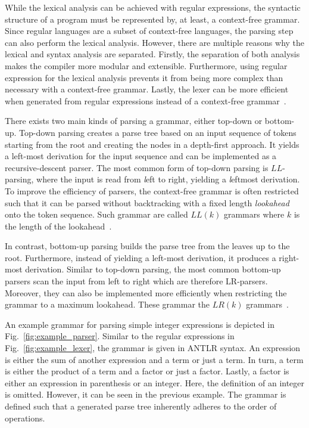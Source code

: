 While the lexical analysis can be achieved with regular expressions, the syntactic structure of a program must be represented by, at least, a context-free grammar. Since regular languages are a subset of context-free languages, 
the parsing step can also perform the lexical analysis. However, there are multiple reasons why the lexical and syntax analysis are separated. Firstly, the separation of both analysis makes the compiler more modular and extensible. Furthermore, using regular expression for the lexical analysis prevents it from being more complex than necessary with a context-free grammar. Lastly, the lexer can be more efficient when generated from regular expressions instead of a context-free grammar~\cite{VSSD07}. 

There exists two main kinds of parsing a grammar, either top-down or bottom-up.
Top-down parsing creates a parse tree based on an input sequence of tokens starting from the root and creating the nodes in a depth-first approach. It yields a left-most derivation for the input sequence and can be implemented as a recursive-descent parser. The most common form of top-down parsing is $LL$-parsing, where the input is read from \emph{l}eft to right, yielding a \emph{l}eftmost derivation. To improve the efficiency of parsers, the context-free grammar is often restricted such that it can be parsed without backtracking with a fixed length \emph{lookahead} onto the token sequence. Such grammar are called $LL(k)$ grammars where $k$ is the length of the lookahead~\cite{VSSD07,PaFi11}.  

In contrast, bottom-up parsing builds the parse tree from the leaves up to the root. Furthermore, instead of yielding a left-most derivation, it produces a right-most derivation. Similar to top-down parsing, the most common bottom-up parsers scan the input from left to right which are therefore LR-parsers. Moreover, they can also be implemented more efficiently when restricting the grammar to a maximum lookahead. These grammar the $LR(k)$ grammars~\cite{VSSD07, PaFi11}.

An example grammar for parsing simple integer expressions is depicted in Fig.~\ref{fig:example_parser}. Similar to the regular expressions in Fig.~\ref{fig:example_lexer}, the grammar is given in ANTLR syntax. An expression is either the sum of another expression and a term or just a term. In turn, a term is either the product of a term and a factor or just a factor. Lastly, a factor is either an expression in parenthesis or an integer. Here, the definition of an integer is omitted. However, it can be seen in the previous example. The grammar is defined such that a generated parse tree inherently adheres to the order of operations.

